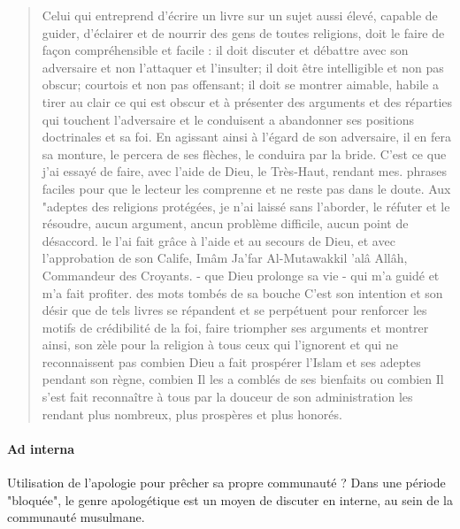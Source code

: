 \begin{quote}
    
Celui qui entreprend d'écrire un livre sur un sujet aussi élevé, capable de guider, d'éclairer et de nourrir des gens de toutes religions, doit le faire de façon compréhensible et facile : il doit discuter et débattre avec son adversaire et non l'attaquer et l'insulter; il doit être intelligible et non pas obscur; courtois et non pas offensant; il doit se montrer aimable, habile a tirer au clair ce qui est obscur et à présenter des arguments et des réparties qui touchent l'adversaire et le conduisent a abandonner ses positions doctrinales et sa foi. En agissant ainsi à l'égard de son adversaire, il en fera sa monture, le percera de ses flèches, le conduira par la bride.
C'est ce que j'ai essayé de faire, avec l'aide de Dieu, le Très-Haut, rendant mes. phrases faciles pour que le lecteur les comprenne et ne reste pas dans le doute.
Aux "adeptes des religions protégées, je n'ai laissé sans l'aborder, le réfuter et le résoudre, aucun argument, ancun problème difficile, aucun point de désaccord. le l'ai fait grâce à l'aide et au secours de Dieu, et avec l'approbation de son Calife, Imâm Ja'far Al-Mutawakkil 'alâ Allâh, Commandeur des Croyants. - que Dieu prolonge sa vie - qui m'a guidé et m'a fait profiter. des mots tombés de sa bouche C'est son intention et son désir que de tels livres se répandent et se perpétuent pour renforcer les motifs de crédibilité de la foi, faire triompher ses arguments et montrer ainsi, son zèle pour la religion à tous ceux qui l'ignorent et qui ne reconnaissent pas combien Dieu a fait prospérer l'Islam et ses adeptes pendant son règne, combien Il les a comblés de ses bienfaits ou combien Il s'est fait reconnaître à tous par la douceur de son administration les rendant plus nombreux, plus prospères et plus honorés.


    
\end{quote}
\paragraph{Ad interna}
Utilisation de l'apologie pour prêcher sa propre communauté ? Dans une période "bloquée", le genre apologétique est un moyen de discuter en interne, au sein de la communauté musulmane.

